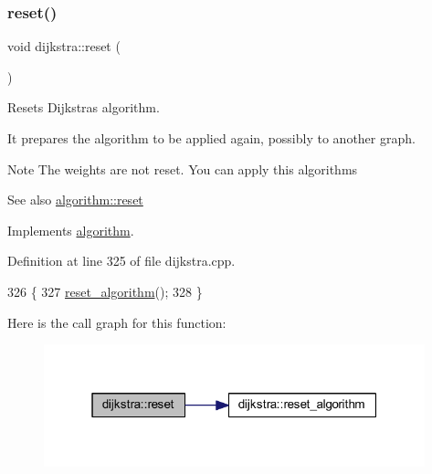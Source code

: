 \subsubsection{\texorpdfstring{reset()}{reset()}}
{\footnotesize\ttfamily void dijkstra\+::reset (\begin{DoxyParamCaption}{ }\end{DoxyParamCaption})\hspace{0.3cm}{\ttfamily [virtual]}}



Resets Dijkstra\textquotesingle{}s algorithm. 

It prepares the algorithm to be applied again, possibly to another graph.

\begin{DoxyNote}{Note}
The weights are not reset. You can apply this algorithms
\end{DoxyNote}
\begin{DoxySeeAlso}{See also}
\mbox{\hyperlink{classalgorithm_a21aba63d066ae7897de6ca7d8425c408}{algorithm\+::reset}} 
\end{DoxySeeAlso}


Implements \mbox{\hyperlink{classalgorithm_a21aba63d066ae7897de6ca7d8425c408}{algorithm}}.



Definition at line 325 of file dijkstra.\+cpp.


\begin{DoxyCode}
326 \{
327     \mbox{\hyperlink{classdijkstra_a70bec540a7f67970a9f19b60c5cbaedd}{reset\_algorithm}}();
328 \}
\end{DoxyCode}
Here is the call graph for this function\+:\nopagebreak
\begin{figure}[H]
\begin{center}
\leavevmode
\includegraphics[width=313pt]{classdijkstra_a444c288b3a49ec1c2973459dad55ffb3_cgraph}
\end{center}
\end{figure}
\mbox{\label{classdijkstra_a70bec540a7f67970a9f19b60c5cbaedd}} 
